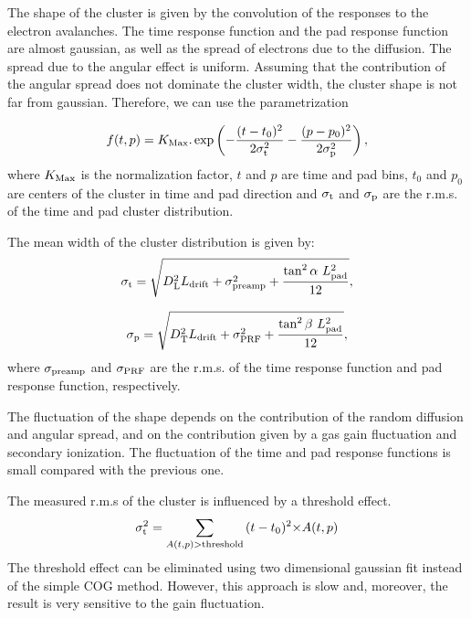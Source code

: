 \documentclass[a4paper,12pt]{article}
\begin{document}
The shape of the cluster is given by the convolution of the
responses to the electron avalanches. The time response function
and the pad response function are almost gaussian, as well as the
spread of electrons due to the diffusion. The spread due to the
angular effect is uniform. Assuming that the contribution of the
angular spread does not dominate the cluster width, the cluster
shape is not far from gaussian. Therefore, we can use the
parametrization

\begin{equation}
       f(t,p) = K_{\rm{Max}}.\exp\left(-\frac{(t-t_{\rm{0}})^2}{2\sigma_{\rm{t}}^2}-
            \frac{(p-p_{\rm{0}})^2}{2\sigma_{\rm{p}}^2}\right),
            \label{eq:GaussTP}
\end{equation}
where  ${K_{\rm{Max}}}$ is the  normalization factor, $t$ and $p$
are time and pad bins, $t_0$ and $p_0$ are centers of the cluster
in time and pad direction and $\sigma_{\rm{t}}$ and
$\sigma_{\rm{p}}$ are the r.m.s. of the time and pad cluster
distribution.

 The mean width of the cluster distribution is given by:
\begin{equation}
     \sigma_{\rm{t}} = \sqrt{D{\rm{^2_L}}L_{\rm{drift}}+\sigma^2_{\rm{preamp}}+
        \frac{\tan^2\alpha~L_{\rm{pad}}^2}{12}},
\end{equation}


\begin{equation}
     \sigma_{\rm{p}} = \sqrt{D{\rm{^2_T}}L_{\rm{drift}}+\sigma^2_{\rm{PRF}}+
        \frac{\tan^2\beta~L_{\rm{pad}}^2}{12}},
\end{equation}
where ${\sigma_{\rm{preamp}}}$ and ${\sigma_{\rm{PRF}}}$  are the
r.m.s. of the time response function and  pad response function,
respectively.

The fluctuation of the shape depends on the contribution of the
random diffusion and angular spread, and on the contribution given
by a gas gain fluctuation and secondary ionization. The
fluctuation of the time and pad response functions is small
compared with the previous one.

The measured r.m.s of the cluster is influenced by a threshold
effect.
\begin{equation}
     \sigma_{\rm{t}}^2 = \sum_{A(t,p)>\rm{threshold}}{(t-t_{\rm{0}})^2{\times}A(t,p)}
\end{equation}
The threshold effect can be eliminated using two dimensional
gaussian fit instead of the simple COG method. However, this
approach is slow and, moreover, the result is very sensitive to
the gain fluctuation.
\end{document}
